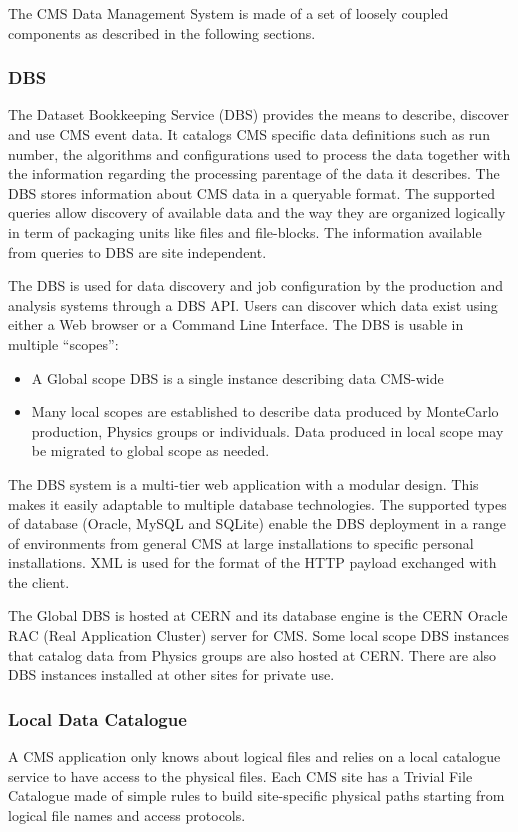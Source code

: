 The CMS Data Management System is made of a set of loosely coupled components as described in the following sections.
\subsubsection{DBS}
\label{sec:3_1_1}
The Dataset Bookkeeping Service (DBS)\cite{RefDBS} provides the means to describe, discover and use CMS event data. 
It catalogs CMS specific data definitions such as run number, the algorithms and configurations used to process the data together with the information regarding the processing parentage of the data it describes.
The DBS stores information about CMS data in a queryable format. The supported queries allow discovery of available data and the way they are organized logically in term of packaging units like files and file-blocks. The information available from queries to DBS are site independent.

The DBS is used for data discovery and job configuration by the production and analysis systems through a DBS API. 
Users can discover %
which data exist using either a Web browser or a Command Line Interface.
The DBS is usable in multiple “scopes”:
\begin{itemize}
\item A Global scope DBS is a single instance describing data CMS-wide 
\item Many local scopes are established to describe data produced by MonteCarlo production, Physics groups or individuals. 
Data produced in local scope may be migrated to global scope as needed.

\end{itemize}
The DBS system is a multi-tier web application with a modular design. This makes it easily adaptable to multiple database technologies. The supported types of database (Oracle, MySQL and SQLite) enable the DBS deployment in a range of environments from general CMS at large installations to specific personal installations.
XML is used for the format of the HTTP payload exchanged with the client.

The Global DBS is hosted at CERN and its database engine is the CERN Oracle RAC (Real Application Cluster) server for CMS. Some local scope DBS instances that catalog data from Physics groups are also hosted at CERN. There are also DBS instances installed at other sites for private use. 

\subsubsection{Local Data Catalogue}
\label{sec:3_1_2}
A CMS application only knows about logical files and relies on a local catalogue service to have access to the physical files.
Each CMS site has a Trivial File Catalogue made of simple rules to build site-specific physical paths starting from logical file names and access protocols.

